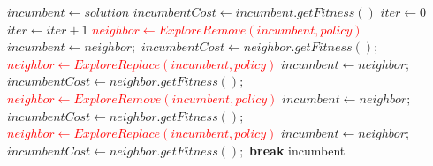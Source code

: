 \documentclass{article}
\begin{document}
\begin{algorithm}[H]
\renewcommand{\thealgorithm}{}
\caption{Local Search}
\begin{algorithmic}
\State $incumbent \gets solution$
    \State $incumbentCost \gets incumbent.getFitness()$
    \State $iter \gets 0$
        \State $iter \gets iter + 1$
            \State \textcolor{red}{$neighbor \gets ExploreRemove(incumbent, policy)$}
                \State $incumbent \gets neighbor;$
                \State $incumbentCost \gets neighbor.getFitness();$
            \EndIf
            \Statex
            \State \textcolor{red}{$neighbor \gets ExploreReplace(incumbent, policy)$}
                \State $incumbent \gets neighbor;$
                \State $incumbentCost \gets neighbor.getFitness();$
            \EndIf
        \Statex
            \State \textcolor{red}{$neighbor \gets ExploreRemove(incumbent, policy)$}
                \State $incumbent \gets neighbor;$
                \State $incumbentCost \gets neighbor.getFitness();$
            \EndIf
        \Else
            \State \textcolor{red}{$neighbor \gets ExploreReplace(incumbent, policy)$}
                \State $incumbent \gets neighbor;$
                \State $incumbentCost \gets neighbor.getFitness();$
            \EndIf
        \EndIf
        \Statex
         \textbf{break} 
        \EndIf
    \EndWhile
    \Statex
    \State \Return incumbent
\EndFunction
\end{algorithmic}
\end{algorithm}


\end{document}
